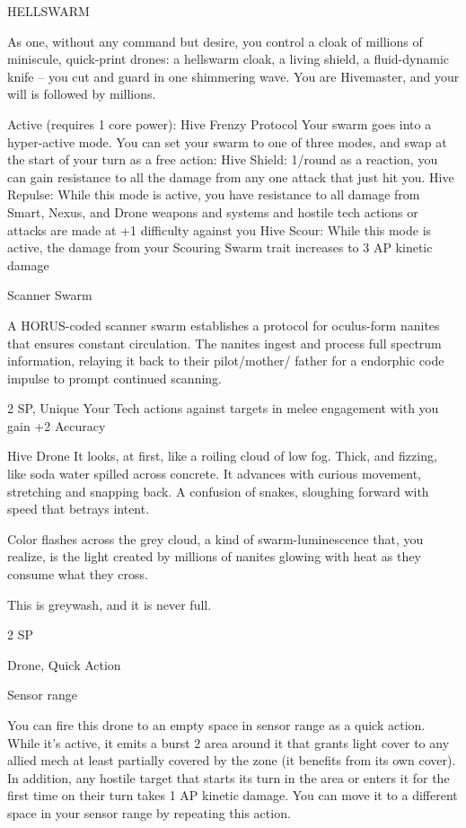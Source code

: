                                                     HELLSWARM

 As one, without any command but desire, you control a cloak of millions of miniscule, quick-print
 drones: a hellswarm cloak, a living shield, a fluid-dynamic knife -- you cut and guard in one shimmering
 wave. You are Hivemaster, and your will is followed by millions.

 Active (requires 1 core power): Hive Frenzy
 Protocol
 Your swarm goes into a hyper-active mode. You can set your swarm to one of three modes, and swap
 at the start of your turn as a free action:
 Hive Shield: 1/round as a reaction, you can gain resistance to all the damage from any one attack that
 just hit you.
 Hive Repulse: While this mode is active, you have resistance to all damage from Smart, Nexus, and
  Drone weapons and systems and hostile tech actions or attacks are made at +1 difficulty against you
 Hive Scour: While this mode is active, the damage from your Scouring Swarm trait increases to 3 AP
  kinetic damage

Scanner Swarm

A HORUS-coded scanner swarm establishes a protocol for oculus-form nanites that ensures constant
circulation. The nanites ingest and process full spectrum information, relaying it back to their pilot/mother/
father for a endorphic code impulse to prompt continued scanning.

2 SP, Unique
Your Tech actions against targets in melee engagement with you gain +2 Accuracy


Hive Drone
It looks, at first, like a roiling cloud of low fog. Thick, and fizzing, like soda water spilled across concrete. It
advances with curious movement, stretching and snapping back. A confusion of snakes, sloughing forward
with speed that betrays intent.

Color flashes across the grey cloud, a kind of swarm-luminescence that, you realize, is the light created by
millions of nanites glowing with heat as they consume what they cross.

This is greywash, and it is never full.

2 SP

Drone, Quick Action


Sensor range

You can fire this drone to an empty space in sensor range as a quick action. While it’s active, it
emits a burst 2 area around it that grants light cover to any allied mech at least partially covered
by the zone (it benefits from its own cover). In addition, any hostile target that starts its turn in the
area or enters it for the first time on their turn takes 1 AP kinetic damage. You can move it to a
different space in your sensor range by repeating this action.


